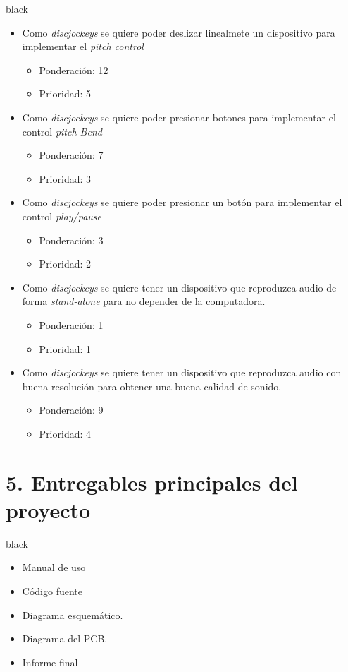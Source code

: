 \documentclass[11pt]{charter}
\begin{document}
\begin{consigna}{black}
\begin{itemize}
\item Como \textit{discjockeys} se quiere poder deslizar linealmete un dispositivo para implementar el \textit{pitch control} 
\begin{itemize}
\item Ponderación: 12
\item Prioridad: 5
\end{itemize}
\item Como \textit{discjockeys} se quiere poder presionar botones para implementar el control \textit{pitch Bend} 
\begin{itemize}
\item Ponderación: 7
\item Prioridad: 3
\end{itemize}
\item Como \textit{discjockeys} se quiere poder presionar un botón para implementar el control \textit{play/pause}
\begin{itemize}
\item Ponderación: 3
\item Prioridad: 2
\end{itemize}
\item Como \textit{discjockeys} se quiere tener un dispositivo que reproduzca audio de forma \textit{stand-alone} para no depender de la computadora.
\begin{itemize}
\item Ponderación: 1
\item Prioridad: 1
\end{itemize}
\item Como \textit{discjockeys} se quiere tener un dispositivo que reproduzca audio con buena resolución para obtener una buena calidad de sonido.
\begin{itemize}
\item Ponderación: 9
\item Prioridad: 4
\end{itemize}
\end{itemize}

\end{consigna}

\section{5. Entregables principales del proyecto}
\label{sec:entregables}

\begin{consigna}{black}
\begin{itemize}
\item Manual de uso
\item Código fuente
\item Diagrama esquemático.
\item Diagrama del PCB.
\item Informe final

\end{itemize}

\end{consigna}
\end{document}
